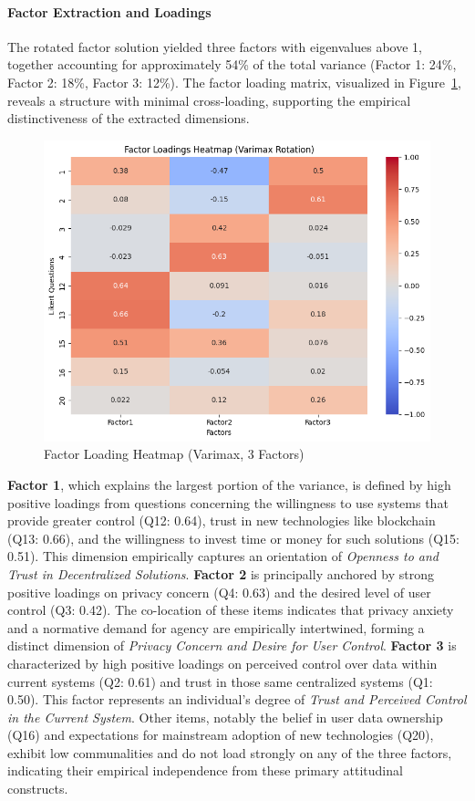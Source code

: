 	\paragraph{Factor Extraction and Loadings}
	The rotated factor solution yielded three factors with eigenvalues above 1, together accounting for approximately 54\% of the total variance (Factor 1: 24\%, Factor 2: 18\%, Factor 3: 12\%). The factor loading matrix, visualized in Figure~\ref{fig:factor_loadings_heatmap}, reveals a structure with minimal cross-loading, supporting the empirical distinctiveness of the extracted dimensions.
	\begin{figure}[ht]\centering
		\includegraphics[width=0.7\linewidth]{figures/img/factor_analysis/factor_loadings_heatmap.png}
		\caption{Factor Loading Heatmap (Varimax, 3 Factors)}
		\label{fig:factor_loadings_heatmap}
	\end{figure}
	\textbf{Factor 1}, which explains the largest portion of the variance, is defined by high positive loadings from questions concerning the willingness to use systems that provide greater control (Q12: 0.64), trust in new technologies like blockchain (Q13: 0.66), and the willingness to invest time or money for such solutions (Q15: 0.51). This dimension empirically captures an orientation of \textit{Openness to and Trust in Decentralized Solutions}.
	\textbf{Factor 2} is principally anchored by strong positive loadings on privacy concern (Q4: 0.63) and the desired level of user control (Q3: 0.42). The co-location of these items indicates that privacy anxiety and a normative demand for agency are empirically intertwined, forming a distinct dimension of \textit{Privacy Concern and Desire for User Control}.
	\textbf{Factor 3} is characterized by high positive loadings on perceived control over data within current systems (Q2: 0.61) and trust in those same centralized systems (Q1: 0.50). This factor represents an individual's degree of \textit{Trust and Perceived Control in the Current System}.
	Other items, notably the belief in user data ownership (Q16) and expectations for mainstream adoption of new technologies (Q20), exhibit low communalities and do not load strongly on any of the three factors, indicating their empirical independence from these primary attitudinal constructs.


